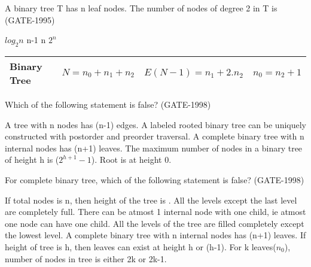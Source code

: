   \begin{questyle}

  \question  A binary tree T has n leaf nodes. The number of nodes of degree 2 in T is  (GATE-1995)

  \begin{oneparchoices}
    \choice         \(log_2n\)
    \CorrectChoice  n-1
    \choice         n
    \choice         \(2^n\)
  \end{oneparchoices}

  \vspace{0.08in}
  \begin{myTableStyle} \begin{tabular}{ |m{2cm}|m{3cm}|m{4cm}|m{2cm}| } \hline
          Binary Tree & \( N= n_0 + n_1 + n_2 \)  &  \( E(N-1) =  n_1 + 2.n_2 \) &  \( n_0 =  n_2 + 1 \)  \\ \hline
  \end{tabular} \end{myTableStyle} \vspace{0.08in}

\end{questyle}


\begin{questyle}
  \question  Which of the following statement is false?  (GATE-1998)

  \begin{choices}
    \choice         A tree with n nodes has (n-1) edges.
    \CorrectChoice  A labeled rooted binary tree can be uniquely constructed with postorder and preorder traversal.
    \CorrectChoice  A complete binary tree with n internal nodes has (n+1) leaves.
    \choice         The maximum number of nodes in a binary tree of height h is (\(2^{h+1} -1\)). Root is at height 0.
  \end{choices}
\end{questyle}

\begin{questyle}
  \question  For complete binary tree, which of the following statement is false? (GATE-1998)

  \begin{choices}
    \choice         If total nodes is n, then height of the tree is \fillin[].
    \choice         All the levels except the last level are completely full.
    \choice         There can be atmost 1 internal node with one child, ie atmost one node can have one child.
    \choice         All the levels of the tree are filled completely except the lowest level.
    \CorrectChoice  A complete binary tree with n internal nodes has (n+1) leaves.
    \choice         If height of tree is h, then leaves can exist at height h or (h-1).
    \choice         For k leaves(\(n_0\)), number of nodes in tree is either 2k or 2k-1.
  \end{choices}
\end{questyle}


